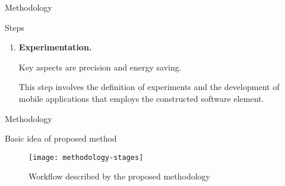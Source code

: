 \begin{frame}{Methodology}
\begin{block}{Steps}
\begin{enumerate}
      \item \textbf{Experimentation.}

        Key aspects are precision and energy saving.
        
        
        
        This step involves the definition of experiments and the development of mobile applications that employs the constructed software element.


    \end{enumerate}
  \end{block}
\end{frame}


\begin{frame}{Methodology}
  \begin{block}{Basic idea of proposed method}
    \begin{figure}
      \centering
      \texttt{[image: methodology-stages]}
      \caption[Methodology workflow]{Workflow described by the proposed methodology}
      \label{fig-methodology-workflow}
    \end{figure}
  \end{block}
\end{frame}